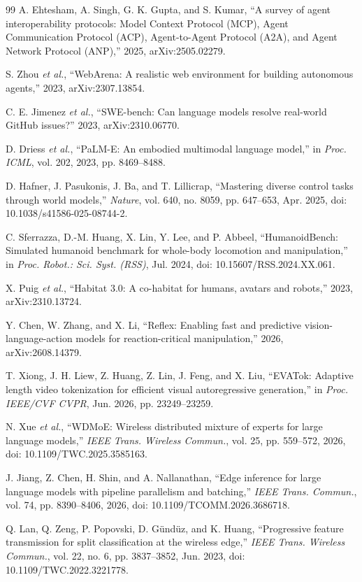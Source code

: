 \documentclass[letterpaper,journal]{IEEEtran}
\newcommand{\etal}{\emph{et al.}}
\begin{document}
\begin{thebibliography}{99}
A. Ehtesham, A. Singh, G. K. Gupta, and S. Kumar, ``A survey of agent
interoperability protocols: Model Context Protocol (MCP), Agent Communication
Protocol (ACP), Agent-to-Agent Protocol (A2A), and Agent Network Protocol
(ANP),'' 2025, arXiv:2505.02279.

S. Zhou \etal, ``WebArena: A realistic web environment for building
autonomous agents,'' 2023, arXiv:2307.13854.

C. E. Jimenez \etal, ``SWE-bench: Can language models resolve real-world GitHub
issues?'' 2023, arXiv:2310.06770.

D. Driess \etal, ``PaLM-E: An embodied multimodal language model,'' in
\emph{Proc. ICML}, vol. 202, 2023, pp. 8469--8488.

D. Hafner, J. Pasukonis, J. Ba, and T. Lillicrap, ``Mastering diverse control
tasks through world models,'' \emph{Nature}, vol. 640, no. 8059, pp. 647--653,
Apr. 2025, doi: 10.1038/s41586-025-08744-2.

C. Sferrazza, D.-M. Huang, X. Lin, Y. Lee, and P. Abbeel,
``HumanoidBench: Simulated humanoid benchmark for whole-body locomotion and
manipulation,'' in \emph{Proc. Robot.: Sci. Syst. (RSS)}, Jul. 2024,
doi: 10.15607/RSS.2024.XX.061.

X. Puig \etal, ``Habitat 3.0: A co-habitat for humans, avatars and robots,''
2023, arXiv:2310.13724.

Y. Chen, W. Zhang, and X. Li, ``Reflex: Enabling fast and predictive
vision-language-action models for reaction-critical manipulation,''
2026, arXiv:2608.14379.

T. Xiong, J. H. Liew, Z. Huang, Z. Lin, J. Feng, and X. Liu, ``EVATok:
Adaptive length video tokenization for efficient visual autoregressive
generation,'' in \emph{Proc. IEEE/CVF CVPR}, Jun. 2026, pp. 23249--23259.

N. Xue \etal, ``WDMoE: Wireless distributed mixture of experts for large
language models,'' \emph{IEEE Trans. Wireless Commun.}, vol. 25,
pp. 559--572, 2026,
doi: 10.1109/TWC.2025.3585163.

J. Jiang, Z. Chen, H. Shin, and A. Nallanathan, ``Edge inference for large
language models with pipeline parallelism and batching,'' \emph{IEEE Trans.
Commun.}, vol. 74, pp. 8390--8406, 2026, doi: 10.1109/TCOMM.2026.3686718.

Q. Lan, Q. Zeng, P. Popovski, D. G\"und\"uz, and K. Huang, ``Progressive
feature transmission for split classification at the wireless edge,''
\emph{IEEE Trans. Wireless Commun.}, vol. 22, no. 6, pp. 3837--3852,
Jun. 2023,
doi: 10.1109/TWC.2022.3221778.


\end{thebibliography}
\end{document}
